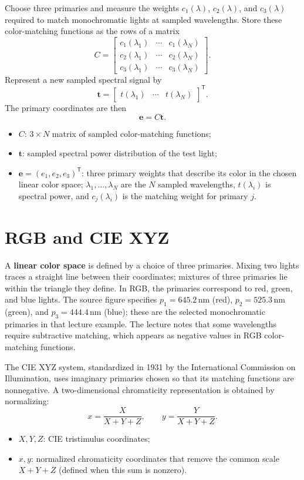 \documentclass[11pt,a4paper,oneside]{report}
\newcommand{\mathlegend}[1]{%
  \par\vspace{0.2em}{\small\itshape where}\par
  \begin{itemize}[leftmargin=1.7em,topsep=0.15em,itemsep=0.12em]
  #1
  \end{itemize}
}
\begin{document}
Choose three primaries and measure the weights $c_1(\lambda)$, $c_2(\lambda)$, and $c_3(\lambda)$ required to match monochromatic lights at sampled wavelengths. Store these color-matching functions as the rows of a matrix
\begin{equation}
C=\begin{bmatrix}
 c_1(\lambda_1)&\cdots&c_1(\lambda_N)\\
 c_2(\lambda_1)&\cdots&c_2(\lambda_N)\\
 c_3(\lambda_1)&\cdots&c_3(\lambda_N)
\end{bmatrix}.
\end{equation}
Represent a new sampled spectral signal by
\[
\mathbf{t}=\begin{bmatrix}t(\lambda_1)&\cdots&t(\lambda_N)\end{bmatrix}^{\mathsf T}.
\]
The primary coordinates are then
\begin{equation}
  \mathbf{e}=C\mathbf{t}.
  \label{eq:color-matching-matrix}
\end{equation}
\mathlegend{
  \item $C$: $3\times N$ matrix of sampled color-matching functions;
  \item $\mathbf{t}$: sampled spectral power distribution of the test light;
  \item $\mathbf{e}=(e_1,e_2,e_3)^{\mathsf T}$: three primary weights that describe its color in the chosen linear color space; $\lambda_1,\ldots,\lambda_N$ are the $N$ sampled wavelengths, $t(\lambda_i)$ is spectral power, and $c_j(\lambda_i)$ is the matching weight for primary $j$.
}

\section{RGB and CIE XYZ}

A \textbf{linear color space} is defined by a choice of three primaries. Mixing two lights traces a straight line between their coordinates; mixtures of three primaries lie within the triangle they define. In RGB, the primaries correspond to red, green, and blue lights. The source figure specifies $p_1=645.2\,\mathrm{nm}$ (red), $p_2=525.3\,\mathrm{nm}$ (green), and $p_3=444.4\,\mathrm{nm}$ (blue); these are the selected monochromatic primaries in that lecture example. The lecture notes that some wavelengths require subtractive matching, which appears as negative values in RGB color-matching functions.

The CIE XYZ system, standardized in 1931 by the International Commission on Illumination, uses imaginary primaries chosen so that its matching functions are nonnegative. A two-dimensional chromaticity representation is obtained by normalizing:
\begin{equation}
  x=\frac{X}{X+Y+Z}, \qquad y=\frac{Y}{X+Y+Z}.
  \label{eq:cie-xy}
\end{equation}
\mathlegend{
  \item $X,Y,Z$: CIE tristimulus coordinates;
  \item $x,y$: normalized chromaticity coordinates that remove the common scale $X+Y+Z$ (defined when this sum is nonzero).
}
\end{document}
